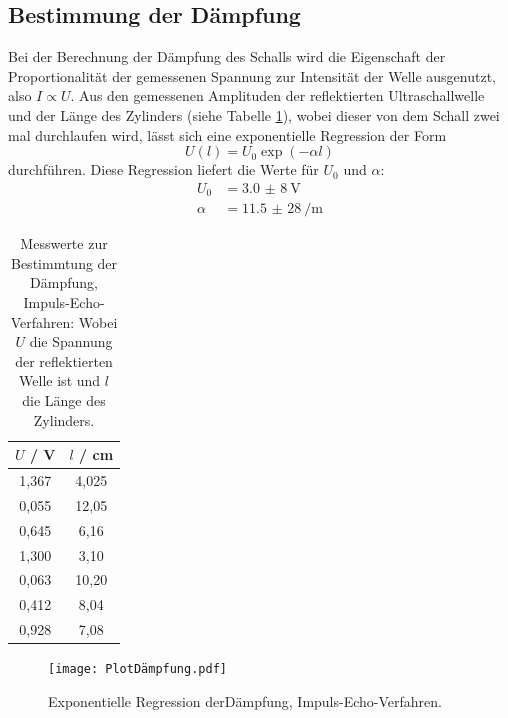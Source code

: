 \subsection{Bestimmung der Dämpfung}
Bei der Berechnung der Dämpfung des Schalls wird die Eigenschaft der Proportionalität der gemessenen Spannung zur Intensität der Welle ausgenutzt, also
$I \propto U$. Aus den gemessenen Amplituden der reflektierten Ultraschallwelle und der Länge des Zylinders (siehe Tabelle \ref{tab:2}), wobei dieser
von dem Schall zwei mal durchlaufen wird, lässt sich eine exponentielle Regression der Form
\begin{equation*}
  U(l) = U_0 \exp(-\alpha l)
\end{equation*}
durchführen. Diese Regression liefert die Werte für $U_0$ und $\alpha$:
\begin{align*}
  U_0 &= \SI{3,0(8)}{\volt} \\
  \alpha &= \SI{11,5(28)}{\per\meter}
\end{align*}
\begin{table}
  \centering
  \caption{Messwerte zur Bestimmtung der Dämpfung, Impuls-Echo-Verfahren: Wobei $U$ die Spannung der reflektierten Welle ist und $l$ die Länge des Zylinders.}
  \label{tab:2}
  \begin{tabular}{c c}
    \toprule
    $U$ / \si{\volt} & $l$ / \si{\centi\meter} \\
    \midrule
     1,367 & 4,025 \\
     0,055 & 12,05 \\
     0,645 & 6,16 \\
     1,300 & 3,10 \\
     0,063 & 10,20 \\
     0,412 & 8,04 \\
     0,928 & 7,08  \\
    \bottomrule
  \end{tabular}
\end{table}
\begin{figure}
  \centering
  \texttt{[image: PlotDämpfung.pdf]}
  \caption{Exponentielle Regression derDämpfung, Impuls-Echo-Verfahren.}
  \label{abb:2}
\end{figure}

